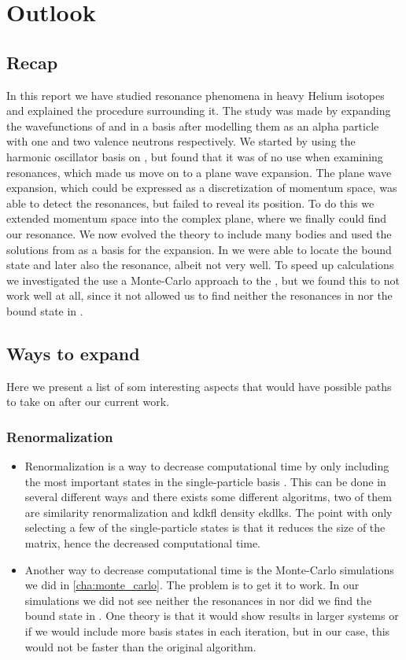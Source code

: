 \documentclass[../main/report.tex]{subfiles}
\begin{document}
\chapter{Outlook}
\label{cha:outlook}

\section{Recap}
In this report we have studied resonance phenomena in heavy Helium isotopes and explained the procedure surrounding it.
The study was made by expanding the wavefunctions of  and  in a basis after modelling them as an alpha particle with one and two valence neutrons respectively.
We started by using the harmonic oscillator basis on , but found that it was of no use when examining resonances, which made us move on to a plane wave expansion.
The plane wave expansion, which could be expressed as a discretization of momentum space, was able to detect the resonances, but failed to reveal its position.
To do this we extended momentum space into the complex plane, where we finally could find our resonance.
We now evolved the theory to include many bodies and used the solutions from  as a basis for the  expansion.
In  we were able to locate the bound state and later also the resonance, albeit not very well.
To speed up calculations we investigated the use a Monte-Carlo approach to the , but we found this to not work well at all, since it not allowed us to find neither the resonances in  nor the bound state in .


\section{Ways to expand}
Here we present a list of som interesting aspects that would have possible paths to take on after our current work.
\subsection{Renormalization}
  \begin{itemize}
    \item Renormalization is a way to decrease computational time by only including the most important states in the single-particle basis \cite{DMRG}.
    This can be done in several different ways and there exists some different algoritms, two of them are similarity renormalization and kdkfl density ekdlks.
    The point with only selecting a few of the single-particle states is that it reduces the size of the matrix, hence the decreased computational time.
    \item Another way to decrease computational time is the Monte-Carlo simulations we did in \cref{cha:monte_carlo}.
    The problem is to get it to work.
    In our simulations we did not see neither the resonances in  nor did we find the bound state in .
    One theory is that it would show results in larger systems or if we would include more basis states in each iteration, but in our case, this would not be faster than the original algorithm.
  \end{itemize}
\end{document}
